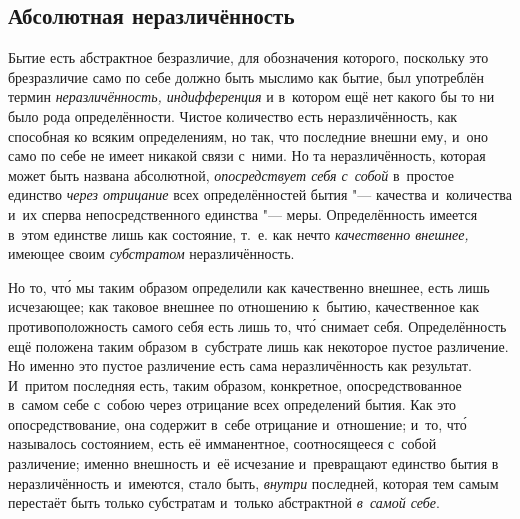 \subsection{Абсолютная неразличённость}

Бытие есть абстрактное безразличие, для обозначения которого, поскольку это
брезразличие само по себе должно быть мыслимо как бытие, был употреблён
термин {\em неразличённость, индифференция}
и в~котором ещё нет какого бы то ни было рода определённости. Чистое количество
есть неразличённость, как способная ко всяким определениям, но так, что
последние внешни ему, и~оно само по себе не имеет никакой связи с~ними. Но та
неразличённость, которая может быть названа абсолютной, {\em опосредствует себя
с~собой} в~простое единство {\em через отрицание} всех определённостей бытия
"--- качества и~количества и~их сперва непосредственного единства "--- меры.
Определённость имеется в~этом единстве лишь как состояние, т.~е. как нечто
{\em качественно внешнее,} имеющее своим {\em субстратом} неразличённость.

Но то, чт\'{о} мы таким образом определили как качественно внешнее, есть лишь
исчезающее; как таковое внешнее по отношению к~бытию, качественное как
противоположность самого себя есть лишь то, чт\'{о} снимает себя.
Определённость ещё положена таким образом в~субстрате лишь как некоторое пустое
различение. Но именно это пустое различение есть сама неразличённость
как результат. И~притом последняя есть, таким образом, конкретное,
опосредствованное в~самом себе с~собою через отрицание всех определений бытия.
Как это опосредствование, она содержит в~себе отрицание и~отношение; и~то,
чт\'{о} называлось состоянием, есть её имманентное, соотносящееся с~собой
различение; именно внешность и~её исчезание и~превращают единство бытия
в неразличённость и~имеются, стало быть, {\em внутри} последней, которая тем
самым перестаёт быть только субстратам и~только абстрактной {\em в~самой себе}.

